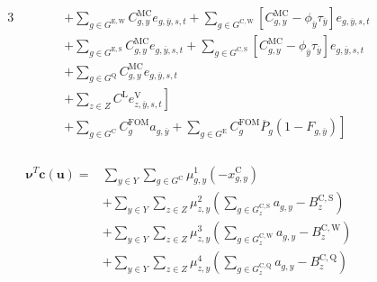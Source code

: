 \documentclass{article}
\newcommand{\sGeneratorsExisting}{G^{\mathrm{E}}}
\newcommand{\sGeneratorsExistingWind}{G^{\mathrm{E,W}}}
\newcommand{\sGeneratorsExistingSolar}{G^{\mathrm{E,S}}}
\newcommand{\sGeneratorsCandidate}{G^{\mathrm{C}}}
\newcommand{\sGeneratorsCandidateWind}{G^{\mathrm{C,W}}}
\newcommand{\sGeneratorsCandidateSolar}{G^{\mathrm{C,S}}}
\newcommand{\sStorage}{G^{\mathrm{Q}}}
\newcommand{\sStorageCandidate}{G^{\mathrm{C,Q}}}
\newcommand{\sYears}{Y}
\newcommand{\sZones}{Z}
\newcommand{\iGenerator}{g}
\newcommand{\iYear}{y}
\newcommand{\iYearTerminal}{\overline{\iYear}}
\newcommand{\iScenario}{s}
\newcommand{\iInterval}{t}
\newcommand{\iZone}{z}
\newcommand{\cFixedOperationsMaintenanceCostGenerator}[1][\iGenerator]{C^{\mathrm{FOM}}_{#1}}
\newcommand{\cMarginalCost}[1][\iGenerator,\iYear]{C^{\mathrm{MC}}_{#1}}
\newcommand{\cPowerOutputMax}[1][\iGenerator,\iYear]{\overline{P}_{#1}}
\newcommand{\cBuildLimitWind}{B^{\mathrm{C,\mathrm{W}}}_{\iZone}}
\newcommand{\cBuildLimitSolar}{B^{\mathrm{C,\mathrm{S}}}_{\iZone}}
\newcommand{\cBuildLimitStorage}{B^{\mathrm{C,\mathrm{Q}}}_{\iZone}}
\newcommand{\cLostLoadCost}{C^{\mathrm{L}}}
\newcommand{\cRetirementIndicator}[1][\iGenerator,\iYear]{F_{#1}}
\newcommand{\vBaseline}[1][\iYear]{\phi_{#1}}
\newcommand{\vPermitPrice}[1][\iYear]{\tau_{#1}}
\newcommand{\vEnergy}[1][\iGenerator,\iYear,\iScenario,\iInterval]{e_{#1}}
\newcommand{\vInstalledCapacity}[1][\iGenerator,\iYear]{x^{\mathrm{C}}_{#1}}
\newcommand{\vLostLoadEnergy}[1][\iZone,\iYear,\iScenario,\iInterval]{e^{\mathrm{V}}_{#1}}
\newcommand{\vInstalledCapacityTotal}[1][\iGenerator,\iYear]{a_{#1}}
\newcommand{\dNonNegativeCandidateCapacity}[1][\iGenerator,\iYear]{\mu_{#1}^{1}}
\newcommand{\dSolarBuildLimit}[1][\iZone,\iYear]{\mu_{#1}^{2}}
\newcommand{\dWindBuildLimit}[1][\iZone,\iYear]{\mu_{#1}^{3}}
\newcommand{\dStorageBuildLimit}[1][\iZone,\iYear]{\mu_{#1}^{4}}
\begin{document}
\begin{alignat}{3}
	& && && + \sum\limits_{\iGenerator \in \sGeneratorsExistingWind} \cMarginalCost \vEnergy[\iGenerator,\iYearTerminal,\iScenario,\iInterval] + \sum\limits_{\iGenerator \in \sGeneratorsCandidateWind} \left[\cMarginalCost - \vBaseline[\iYearTerminal] \vPermitPrice[\iYearTerminal]\right] \vEnergy[\iGenerator,\iYearTerminal,\iScenario,\iInterval] \nonumber\\
	& && && + \sum\limits_{\iGenerator \in \sGeneratorsExistingSolar} \cMarginalCost \vEnergy[\iGenerator,\iYearTerminal,\iScenario,\iInterval] + \sum\limits_{\iGenerator \in \sGeneratorsCandidateSolar} \left[\cMarginalCost - \vBaseline[\iYearTerminal]\vPermitPrice[\iYearTerminal]\right] \vEnergy[\iGenerator,\iYearTerminal,\iScenario,\iInterval] \nonumber\\
	& && && + \sum\limits_{\iGenerator \in \sStorage} \cMarginalCost \vEnergy[\iGenerator,\iYearTerminal,\iScenario,\iInterval] \nonumber\\
	& && && \left. + \sum\limits_{\iZone \in \sZones} \cLostLoadCost \vLostLoadEnergy[\iZone,\iYearTerminal,\iScenario,\iInterval] \right] \nonumber\\
	& && && \left. + \sum\limits_{\iGenerator \in \sGeneratorsCandidate} \cFixedOperationsMaintenanceCostGenerator \vInstalledCapacityTotal[\iGenerator,\iYearTerminal] + \sum\limits_{\iGenerator \in \sGeneratorsExisting} \cFixedOperationsMaintenanceCostGenerator \cPowerOutputMax[\iGenerator] \left(1 - \cRetirementIndicator[\iGenerator,\iYearTerminal]\right)\right]\\\nonumber
\end{alignat}

\begin{align}
\begin{split}
\bm{\nu}^{T}\bm{c}(\bm{u}) = & \sum\limits_{\iYear \in \sYears} \sum\limits_{\iGenerator \in \sGeneratorsCandidate} \dNonNegativeCandidateCapacity \left(-\vInstalledCapacity\right)\\
& + \sum\limits_{\iYear \in \sYears}\sum\limits_{\iZone \in \sZones} \dSolarBuildLimit \left(\sum\limits_{\iGenerator \in \sGeneratorsCandidateSolar_{\iZone}} \vInstalledCapacityTotal - \cBuildLimitSolar\right)\\
& + \sum\limits_{\iYear \in \sYears}\sum\limits_{\iZone \in \sZones} \dWindBuildLimit \left(\sum\limits_{\iGenerator \in \sGeneratorsCandidateWind_{\iZone}} \vInstalledCapacityTotal - \cBuildLimitWind\right)\\
& + \sum\limits_{\iYear \in \sYears}\sum\limits_{\iZone \in \sZones} \dStorageBuildLimit \left(\sum\limits_{\iGenerator \in \sStorageCandidate_{\iZone}} \vInstalledCapacityTotal - \cBuildLimitStorage\right)\\
\end{split}
\end{align}
\end{document}
